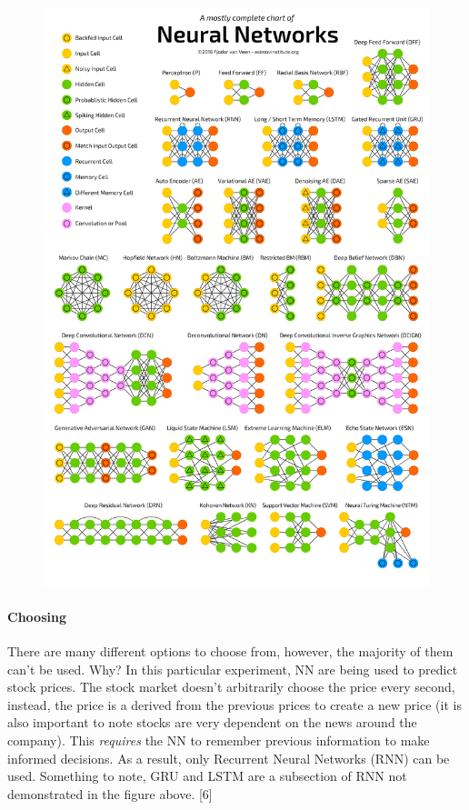 \documentclass[12pt]{article}
\begin{document}
\begin{figure}[H]
  \includegraphics[width=\linewidth]{images/DifferentNN.png}
\end{figure}

\paragraph{Choosing}
There are many different options to choose from, however, the majority of them can't be used. Why? In this particular experiment, NN are being used to predict stock prices. The stock market doesn't arbitrarily choose the price every second, instead, the price is a derived from the previous prices to create a new price (it is also important to note stocks are very dependent on the news around the company). This \textit{requires} the NN to remember previous information to make informed decisions. As a result, only Recurrent Neural Networks (RNN) can be used. Something to note, GRU and LSTM are a subsection of RNN not demonstrated in the figure above. [6]  \nocite{tch_2017}
\end{document}
